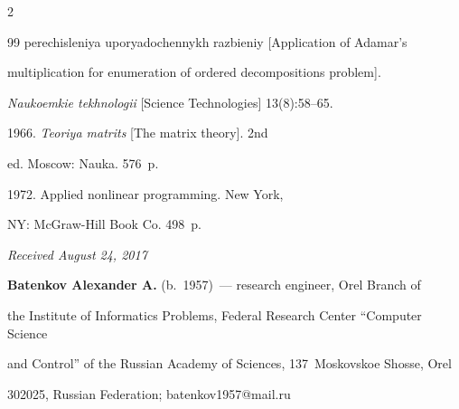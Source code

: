 \begin{multicols}{2}
{{\begin{thebibliography}{99}
perechisleniya uporyadochennykh razbieniy [Application of Adamar's 


multiplication for enumeration of ordered decompositions problem]. 


\textit{Naukoemkie tekhnologii} [Science Technologies]  13(8):58--65.




 1966. \textit{Teoriya matrits} [The matrix theory]. 2nd 


ed.  Moscow: Nauka. 576~p.




 1972. Applied nonlinear programming. New York, 


NY: McGraw-Hill Book Co. 498~p.


\end{thebibliography}





 }


 }





\end{multicols}





\vspace*{-3pt}





\hfill{\small\textit{Received August 24, 2017}}







  


  \Contr


  


  \noindent


  \textbf{Batenkov Alexander A.} (b.\ 1957)~--- research engineer, Orel Branch of 


the Institute of Informatics Problems, Federal Research Center ``Computer Science 


and Control'' of the Russian Academy of Sciences, 137~Moskovskoe Shosse, Orel 


302025, Russian Federation; \mbox{batenkov1957@mail.ru}


